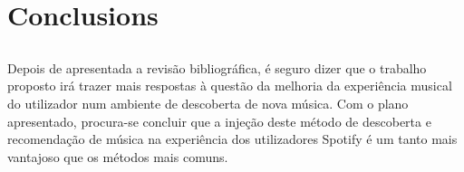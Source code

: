 
\chapter{Conclusions} \label{chap:concl}

\section*{}

Depois de apresentada a revisão bibliográfica, é seguro dizer que o trabalho proposto irá trazer mais respostas à questão da melhoria da experiência musical do utilizador num ambiente de descoberta de nova música.
Com o plano apresentado, procura-se concluir que a injeção deste método de descoberta e recomendação de música na experiência dos utilizadores Spotify é um tanto mais vantajoso que os métodos mais comuns.